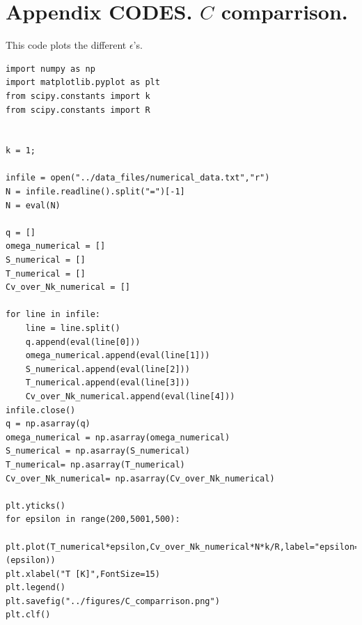 \documentclass[reprint,english,notitlepage]{revtex4-1}  %
\begin{document}
\section*{Appendix CODES. $C$ comparrison.}
This code plots the different $\epsilon$'s.
\begin{lstlisting}
import numpy as np
import matplotlib.pyplot as plt
from scipy.constants import k
from scipy.constants import R


k = 1;

infile = open("../data_files/numerical_data.txt","r")
N = infile.readline().split("=")[-1]
N = eval(N)

q = []
omega_numerical = []
S_numerical = []
T_numerical = []
Cv_over_Nk_numerical = []

for line in infile:
    line = line.split()
    q.append(eval(line[0]))
    omega_numerical.append(eval(line[1]))
    S_numerical.append(eval(line[2]))
    T_numerical.append(eval(line[3]))
    Cv_over_Nk_numerical.append(eval(line[4]))
infile.close()
q = np.asarray(q)
omega_numerical = np.asarray(omega_numerical)
S_numerical = np.asarray(S_numerical)
T_numerical= np.asarray(T_numerical)
Cv_over_Nk_numerical= np.asarray(Cv_over_Nk_numerical)

plt.yticks()
for epsilon in range(200,5001,500):
    plt.plot(T_numerical*epsilon,Cv_over_Nk_numerical*N*k/R,label="epsilon=%g"%(epsilon))
plt.xlabel("T [K]",FontSize=15)
plt.legend()
plt.savefig("../figures/C_comparrison.png")
plt.clf()
\end{lstlisting}





\end{document}
